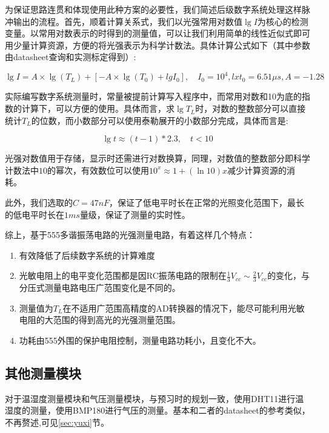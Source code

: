 \documentclass[a4paper, 11pt]{article} %
\begin{document}
为保证思路连贯和体现使用此种方案的必要性，我们简述后级数字系统处理这样脉冲输出的流程。首先，顺着计算关系式，我们以光强常用对数值$\lg I$为核心的检测变量。以常用对数表示的时得到的测量值，可以让我们利用简单的线性近似式即可用少量计算资源，方便的将光强表示为科学计数法。具体计算公式如下（其中参数由datasheet\cite{LDR}查询和实测标定得到）:

\begin{equation*}
  \lg I = A \times \lg(T_L) + [- A \times \lg(T_0) + lg I_0], \quad I_0 = 10^4, lx t_0 = 6.51 \mu s, A = -1.28
\end{equation*}

实际编写数字系统测量时，常量被提前计算写入程序中，而常用对数和10为底的指数的计算下，可以方便的使用。具体而言，求$\lg T_L$时，对数的整数部分可以直接统计$T_L$的位数，而小数部分可以使用泰勒展开的小数部分完成，具体而言是:

\begin{equation*}
  \lg t \approx (t - 1) * 2.3, \quad t < 10
\end{equation*}

光强对数值用于存储，显示时还需进行对数换算，同理，对数值的整数部分即科学计数法中$10$的幂次，有效数位可以使用$10^x \approx 1 + (\ln 10) x$减少计算资源的消耗。

此外，我们选取的$C = 47 nF$，保证了低电平时长在正常的光照变化范围下，最长的低电平时长在$1ms$量级，保证了测量的实时性。

综上，基于555多谐振荡电路的光强测量电路，有着这样几个特点：

\begin{enumerate}
  \item 有效降低了后续数字系统的计算难度
  \item 光敏电阻上的电平变化范围都是因RC振荡电路的限制在$\frac{1}{3}V_{cc} \sim \frac{2}{3}V_{cc}$的变化，与分压式测量电路电压广范围变化是不同的。
  \item 测量值为$T_L$在不适用广范围高精度的AD转换器的情况下，能尽可能利用光敏电阻的大范围的得到高光的光强测量范围。
  \item 功耗由555外围的保护电阻控制，测量电路功耗小，且变化不大。
\end{enumerate}

\subsection{其他测量模块}

对于温湿度测量模块和气压测量模块，与预习时的规划一致，使用DHT11进行温湿度的测量，使用BMP180进行气压的测量。基本和二者的datasheet的参考类似\cite{BMP180}\cite{dht11}，不再赘述,可见\ref{sec:yuxi}节。
\end{document}
